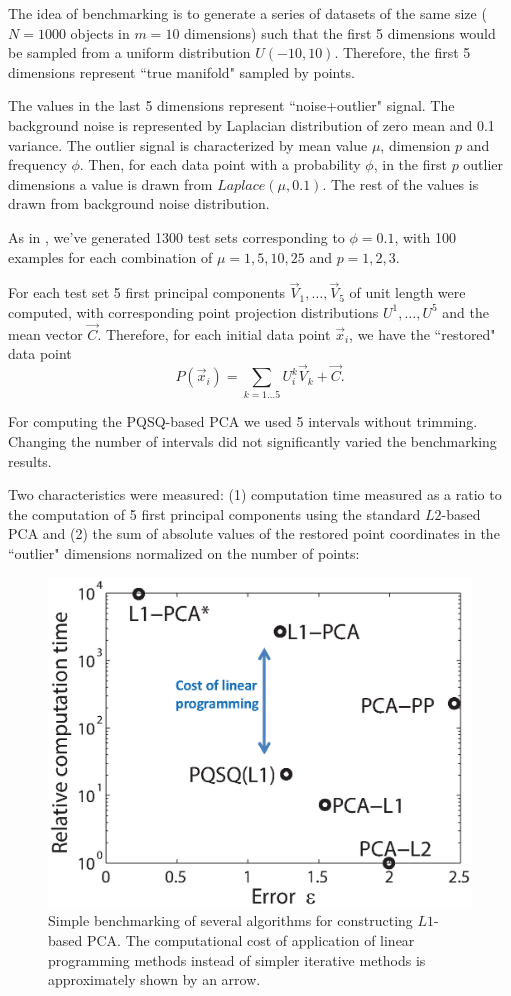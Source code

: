 \documentclass[preprint,12pt,twocolumn]{elsarticle}
\begin{document}
The idea of benchmarking is to generate a series of datasets of the same size ($N=1000$ objects in $m=10$ dimensions) such that the first 5 dimensions would be sampled from a uniform distribution $U(-10,10)$. Therefore, the first 5 dimensions represent ``true manifold" sampled by points.

The values in the last 5 dimensions represent ``noise+outlier" signal. The background noise is represented by Laplacian distribution of zero mean and 0.1 variance. The outlier signal is characterized by mean value $\mu$, dimension $p$ and frequency $\phi$. Then, for each data point with a probability $\phi$, in the first $p$ outlier dimensions a value is drawn from $Laplace(\mu,0.1)$. The rest of the values is drawn from background noise distribution.

As in \cite{brooks2012pcal1}, we've generated 1300 test sets corresponding to $\phi=0.1$, with 100 examples for each combination of $\mu=1,5,10,25$ and $p=1,2,3$.

For each test set 5 first principal components $\vec{V}_1,\dots,\vec{V}_{5}$ of unit length were computed, with corresponding point projection distributions $U^1,\dots,U^{5}$ and the mean vector $\vec{C}$. Therefore, for each initial data point $\vec{x}_i$, we have the ``restored" data point $$P(\vec{x}_i)=\sum_{k=1\dots 5}U^k_i\vec{V}_k+\vec{C}.$$

For computing the PQSQ-based PCA we used 5 intervals without trimming. Changing the number of intervals did not significantly varied the benchmarking results.

Two characteristics were measured: (1) computation time measured as a ratio to the computation of 5 first principal components using the standard $L2$-based PCA and (2) the sum of absolute values of the restored point coordinates in the ``outlier" dimensions normalized on the number of points:

\begin{figure}[h]
\centering\includegraphics[width=0.8\linewidth]{benchmark.eps}
\caption{Simple benchmarking of several algorithms for constructing $L1$-based PCA. The computational cost of application of linear programming methods instead of simpler iterative methods is approximately shown by an arrow. \label{benchmark}}
\end{figure}
\end{document}
